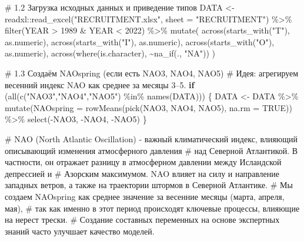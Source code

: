 \documentclass[
  letterpaper,
  DIV=11,
  numbers=noendperiod]{scrreprt}
\newenvironment{Shaded}{\begin{snugshade}}{\end{snugshade}}
\newcommand{\AttributeTok}[1]{\textcolor[rgb]{0.40,0.45,0.13}{#1}}
\newcommand{\CommentTok}[1]{\textcolor[rgb]{0.37,0.37,0.37}{#1}}
\newcommand{\ConstantTok}[1]{\textcolor[rgb]{0.56,0.35,0.01}{#1}}
\newcommand{\ControlFlowTok}[1]{\textcolor[rgb]{0.00,0.23,0.31}{\textbf{#1}}}
\newcommand{\DecValTok}[1]{\textcolor[rgb]{0.68,0.00,0.00}{#1}}
\newcommand{\FunctionTok}[1]{\textcolor[rgb]{0.28,0.35,0.67}{#1}}
\newcommand{\NormalTok}[1]{\textcolor[rgb]{0.00,0.23,0.31}{#1}}
\newcommand{\OtherTok}[1]{\textcolor[rgb]{0.00,0.23,0.31}{#1}}
\newcommand{\SpecialCharTok}[1]{\textcolor[rgb]{0.37,0.37,0.37}{#1}}
\newcommand{\StringTok}[1]{\textcolor[rgb]{0.13,0.47,0.30}{#1}}
\begin{document}
\begin{Shaded}
\begin{Highlighting}[]
\CommentTok{\# 1.2 Загрузка исходных данных и приведение типов}
\NormalTok{DATA }\OtherTok{\textless{}{-}}\NormalTok{ readxl}\SpecialCharTok{::}\FunctionTok{read\_excel}\NormalTok{(}\StringTok{"RECRUITMENT.xlsx"}\NormalTok{, }\AttributeTok{sheet =} \StringTok{"RECRUITMENT"}\NormalTok{) }\SpecialCharTok{\%\textgreater{}\%}
  \FunctionTok{filter}\NormalTok{(YEAR }\SpecialCharTok{\textgreater{}} \DecValTok{1989} \SpecialCharTok{\&}\NormalTok{ YEAR }\SpecialCharTok{\textless{}} \DecValTok{2022}\NormalTok{) }\SpecialCharTok{\%\textgreater{}\%}
  \FunctionTok{mutate}\NormalTok{(}
    \FunctionTok{across}\NormalTok{(}\FunctionTok{starts\_with}\NormalTok{(}\StringTok{"T"}\NormalTok{), as.numeric),}
    \FunctionTok{across}\NormalTok{(}\FunctionTok{starts\_with}\NormalTok{(}\StringTok{"I"}\NormalTok{), as.numeric),}
    \FunctionTok{across}\NormalTok{(}\FunctionTok{starts\_with}\NormalTok{(}\StringTok{"O"}\NormalTok{), as.numeric),}
    \FunctionTok{across}\NormalTok{(}\FunctionTok{where}\NormalTok{(is.character), }\SpecialCharTok{\textasciitilde{}}\FunctionTok{na\_if}\NormalTok{(., }\StringTok{"NA"}\NormalTok{))}
\NormalTok{  )}

\CommentTok{\# 1.3 Создаём NAOspring (если есть NAO3, NAO4, NAO5)}
\CommentTok{\# Идея: агрегируем весенний индекс NAO как среднее за месяцы 3–5.}
\ControlFlowTok{if}\NormalTok{ (}\FunctionTok{all}\NormalTok{(}\FunctionTok{c}\NormalTok{(}\StringTok{"NAO3"}\NormalTok{,}\StringTok{"NAO4"}\NormalTok{,}\StringTok{"NAO5"}\NormalTok{) }\SpecialCharTok{\%in\%} \FunctionTok{names}\NormalTok{(DATA))) \{}
\NormalTok{  DATA }\OtherTok{\textless{}{-}}\NormalTok{ DATA }\SpecialCharTok{\%\textgreater{}\%}
    \FunctionTok{mutate}\NormalTok{(}\AttributeTok{NAOspring =} \FunctionTok{rowMeans}\NormalTok{(}\FunctionTok{pick}\NormalTok{(NAO3, NAO4, NAO5), }\AttributeTok{na.rm =} \ConstantTok{TRUE}\NormalTok{)) }\SpecialCharTok{\%\textgreater{}\%}
    \FunctionTok{select}\NormalTok{(}\SpecialCharTok{{-}}\NormalTok{NAO3, }\SpecialCharTok{{-}}\NormalTok{NAO4, }\SpecialCharTok{{-}}\NormalTok{NAO5)}
\NormalTok{\}}

\CommentTok{\# NAO (North Atlantic Oscillation) {-} важный климатический индекс, влияющий описывающий изменения атмосферного давления}
\CommentTok{\# над Северной Атлантикой. В частности, он отражает разницу в атмосферном давлении между Исландской депрессией и}
\CommentTok{\# Азорским максимумом. NAO влияет на силу и направление западных ветров, а также на траектории штормов в Северной Атлантике. }
\CommentTok{\# Мы создаем NAOspring как среднее значение за весенние месяцы (марта, апреля, мая),}
\CommentTok{\# так как именно в этот период происходят ключевые процессы, влияющие на нерест трески. }
\CommentTok{\# Создание составных переменных на основе экспертных знаний часто улучшает качество моделей.}


\end{Highlighting}
\end{Shaded}
\end{document}
